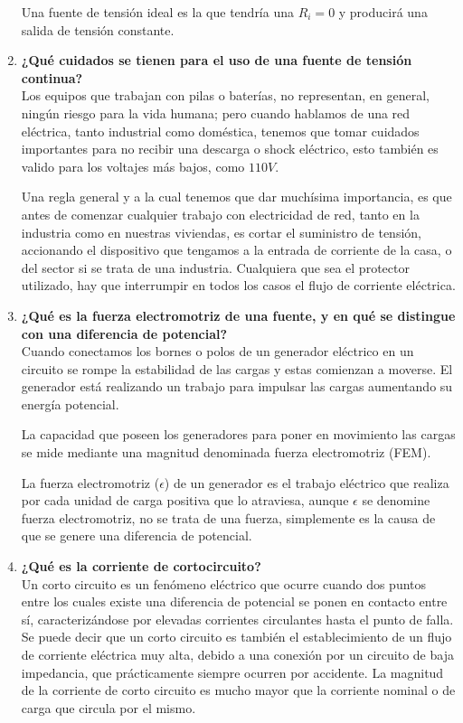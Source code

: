 \documentclass[letter,11pt]{article}
\begin{document}
\begin{enumerate}
Una fuente de tensión ideal es la que tendría una $R_{i} = 0$ y producirá una
salida de tensión constante.

\item \textbf{¿Qué cuidados se tienen para el uso de una fuente de tensión
continua?} \\
Los equipos que trabajan con pilas o baterías, no representan, en general,
ningún riesgo para la vida humana; pero cuando hablamos de una red eléctrica,
tanto industrial como doméstica, tenemos que tomar cuidados importantes para no
recibir una descarga o shock eléctrico, esto también es valido para los voltajes
más bajos, como $110 V$.

Una regla general y a la cual tenemos que dar muchísima importancia, es que
antes de comenzar cualquier trabajo con electricidad de red, tanto en la
industria como en nuestras viviendas, es cortar el suministro de tensión,
accionando el dispositivo que tengamos a la entrada de corriente de la casa, o
del sector si se trata de una industria. Cualquiera que sea el protector
utilizado, hay que interrumpir en todos los casos el flujo de corriente
eléctrica.

\item \textbf{¿Qué es la fuerza electromotriz de una fuente, y en qué se
distingue con una diferencia de potencial?} \\
Cuando conectamos los bornes o polos de un generador eléctrico en un circuito se
rompe la estabilidad de las cargas y estas comienzan a moverse. El generador
está realizando un trabajo para impulsar las cargas aumentando su energía
potencial.

La capacidad que poseen los generadores para poner en movimiento las cargas se
mide mediante una magnitud denominada fuerza electromotriz (FEM).

La fuerza electromotriz ($\epsilon$) de un generador es el trabajo eléctrico que
realiza por cada unidad de carga positiva que lo atraviesa, aunque $\epsilon$ se
denomine fuerza electromotriz, no se trata de una fuerza, simplemente es la
causa de que se genere una diferencia de potencial.

\item \textbf{¿Qué es la corriente de cortocircuito?} \\
Un corto circuito es un fenómeno eléctrico que ocurre cuando dos puntos entre
los cuales existe una diferencia de potencial se ponen en contacto entre sí,
caracterizándose por elevadas corrientes circulantes hasta el punto de falla.
Se puede decir que un corto circuito es también el establecimiento de un flujo
de corriente eléctrica muy alta, debido a una conexión por un circuito de baja
impedancia, que prácticamente siempre ocurren por accidente. La magnitud de la
corriente de corto circuito es mucho mayor que la corriente nominal o de carga
que circula por el mismo.


\end{enumerate}
\end{document}
